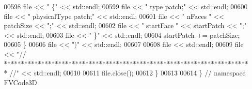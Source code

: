 \begin{DoxyCode}
00598         file << \textcolor{stringliteral}{"    \{"} << std::endl;
00599         file << \textcolor{stringliteral}{"        type            patch;"} << std::endl;
00600         file << \textcolor{stringliteral}{"        physicalType    patch;"} << std::endl;
00601         file << \textcolor{stringliteral}{"        nFaces          "} << patchSize << \textcolor{stringliteral}{";"} << std::endl;
00602         file << \textcolor{stringliteral}{"        startFace       "} << startPatch << \textcolor{stringliteral}{";"} << std::endl;
00603         file << \textcolor{stringliteral}{"    \}"} << std::endl;
00604         startPatch += patchSize;
00605     \}
00606     file << \textcolor{stringliteral}{")"} << std::endl;
00607 
00608     file << std::endl;
00609     file << \textcolor{stringliteral}{"// ************************************************************************* //"} << std::endl;
00610 
00611     file.close();
00612 \}
00613 
00614 \} \textcolor{comment}{// namespace FVCode3D}
\end{DoxyCode}
